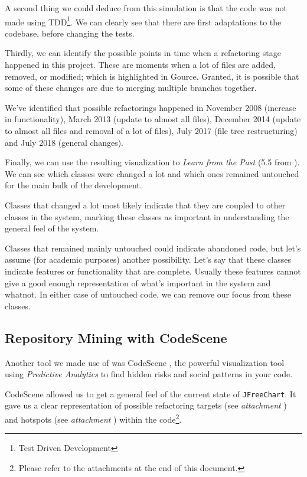 \documentclass[11pt]{article}
\begin{document}
	A second thing we could deduce from this simulation is that the code was not made using TDD\footnote{Test Driven Development}. We can clearly see that there are first adaptations to the codebase, before changing the tests.
	
	Thirdly, we can identify the possible points in time when a refactoring stage happened in this project. These are moments when a lot of files are added, removed, or modified; which is highlighted in \textsf{Gource}. Granted, it is possible that some of these changes are due to merging multiple branches together.
	
	We've identified that possible refactorings happened in November 2008 (increase in functionality), March 2013 (update to almost all files), December 2014 (update to almost all files and removal of a lot of files), July 2017 (file tree restructuring) and July 2018 (general changes).
	
	Finally, we can use the resulting visualization to \textsl{Learn from the Past} (5.5 from \cite{demeyer2009object}). We can see which classes were changed a lot and which ones remained untouched for the main bulk of the development.
	
	Classes that changed a lot most likely indicate that they are coupled to other classes in the system, marking these classes as important in understanding the general feel of the system.
	
	Classes that remained mainly untouched could indicate abandoned code, but let's assume (for academic purposes) another possibility. Let's say that these classes indicate features or functionality that are complete. Usually these features cannot give a good enough representation of what's important in the system and whatnot. In either case of untouched code, we can remove our focus from these classes.
	
	\subsection{Repository Mining with CodeScene}
	\label{sec:codescene}
	Another tool we made use of was \textsf{CodeScene} \cite{codescene}, the powerful visualization tool using \textit{Predictive Analytics} to find hidden risks and social patterns in your code.
	
	\textsf{CodeScene} allowed us to get a general feel of the current state of \texttt{JFreeChart}. It gave us a clear representation of possible refactoring targets (see \textsl{attachment \pageref{refactoring-overview}}) and hotspots (see \textsl{attachment \pageref{hotspots-overview}}) within the code\footnote{Please refer to the attachments at the end of this document.}.
	
\end{document}
